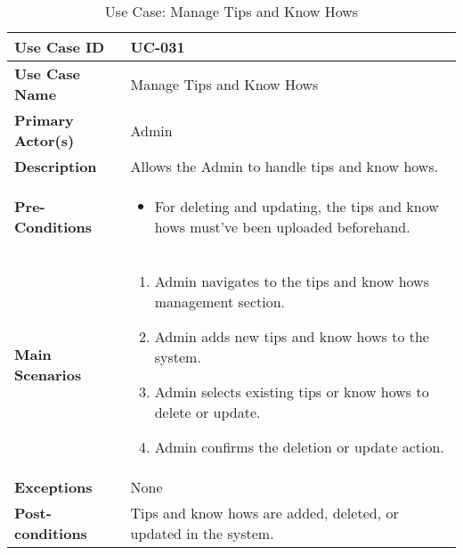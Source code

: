 \begin{table}[ht]
    \centering
    \begin{tabular}{|l|p{}|}
        \hline
        \textbf{Use Case ID} & UC-031 \\
        \hline
        \textbf{Use Case Name} & Manage Tips and Know Hows \\
        \hline
        \textbf{Primary Actor(s)} & Admin \\
        \hline
        \textbf{Description} & Allows the Admin to handle tips and know hows. \\
        \hline
        \textbf{Pre-Conditions} & 
        \begin{itemize}[itemsep=0pt]
            \item For deleting and updating, the tips and know hows must've been uploaded beforehand.
        \end{itemize} \\
        \hline
        \textbf{Main Scenarios} & 
        \begin{enumerate}[label=\arabic*.,itemsep=0pt]
            \item Admin navigates to the tips and know hows management section.
            \item Admin adds new tips and know hows to the system.
            \item Admin selects existing tips or know hows to delete or update.
            \item Admin confirms the deletion or update action.
        \end{enumerate} \\
        \hline
        \textbf{Exceptions} & None \\
        \hline
        \textbf{Post-conditions} & Tips and know hows are added, deleted, or updated in the system. \\
        \hline
    \end{tabular}
    \label{tab:use-case-manage-tips-know-hows}
    \caption{Use Case: Manage Tips and Know Hows}
\end{table}



